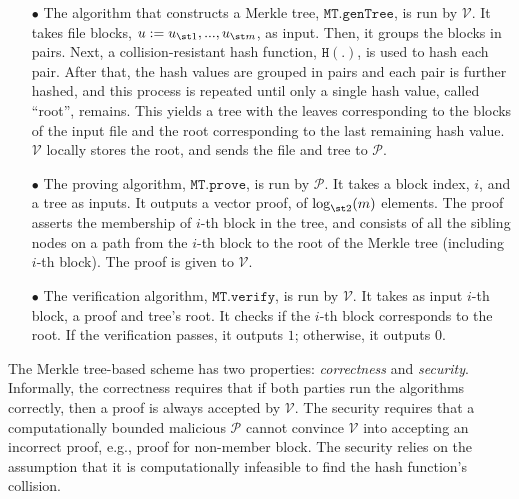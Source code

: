 \begin{itemize}
\item[$\bullet$] The algorithm that constructs a Merkle tree, $\mathtt{MT.genTree}$, is run by $\mathcal{V}$. It takes file blocks, $u:=u_{\st 1},...,u_{\st m}$, as input. Then, it groups the blocks  in pairs. Next,   a collision-resistant hash function, $\mathtt{H}(.)$, is used to hash each pair. After that, the hash values are grouped in pairs and each pair is further hashed, and this process is repeated until only a single hash value, called ``root'', remains. This yields a  tree with the leaves corresponding to the blocks of the input file and the root corresponding to the last remaining hash value.  $\mathcal{V}$ locally stores the root, and sends the file and tree to $\mathcal{P}$.

\item[$\bullet$] The proving algorithm, $\mathtt{MT.prove}$, is run by $\mathcal{P}$. It takes a block index, $i$, and a tree as inputs. It outputs  
a vector proof, of  $\log_{\st 2}(m)$ elements. The proof asserts the membership of $i$-th block in the tree, and consists of  all the sibling nodes on a path from the $i$-th block to the root of the Merkle tree (including $i$-th block). The proof is given to $\mathcal{V}$.

\item[$\bullet$] The verification algorithm, $\mathtt{MT.verify}$, is run by $\mathcal{V}$. It takes as input $i$-th block, a proof and tree's root. It checks if the $i$-th block corresponds to the root. If the verification passes, it outputs $1$; otherwise, it outputs $0$.

\end{itemize}

The Merkle tree-based scheme has two properties: \emph{correctness} and \emph{security}. Informally, the correctness requires that if both parties run the algorithms correctly, then a proof  is always accepted by  $\mathcal{V}$. The security requires that a computationally bounded malicious $\mathcal{P}$ cannot convince  $\mathcal{V}$ into accepting an incorrect proof, e.g., proof for non-member block. The security  relies on the assumption that it is computationally infeasible to find the hash function's collision.  

